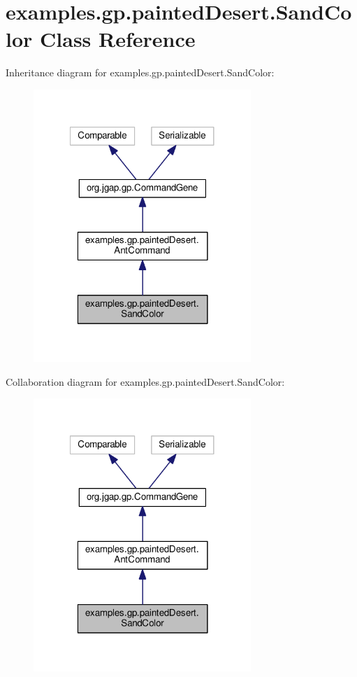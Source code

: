 \hypertarget{classexamples_1_1gp_1_1painted_desert_1_1_sand_color}{\section{examples.\-gp.\-painted\-Desert.\-Sand\-Color Class Reference}
\label{classexamples_1_1gp_1_1painted_desert_1_1_sand_color}
}


Inheritance diagram for examples.\-gp.\-painted\-Desert.\-Sand\-Color\-:
\nopagebreak
\begin{figure}[H]
\begin{center}
\leavevmode
\includegraphics[width=233pt]{classexamples_1_1gp_1_1painted_desert_1_1_sand_color__inherit__graph}
\end{center}
\end{figure}


Collaboration diagram for examples.\-gp.\-painted\-Desert.\-Sand\-Color\-:
\nopagebreak
\begin{figure}[H]
\begin{center}
\leavevmode
\includegraphics[width=233pt]{classexamples_1_1gp_1_1painted_desert_1_1_sand_color__coll__graph}
\end{center}
\end{figure}

